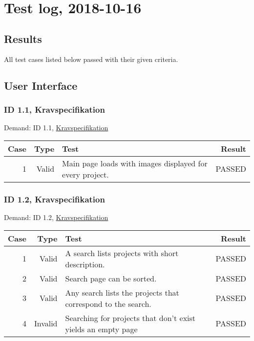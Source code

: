 \documentclass{TDP003mall}
\begin{document}
\section{Test log, 2018-10-16}
\subsection{Results}
All test cases listed below passed with their given criteria.
\subsection{User Interface}
\subsubsection{ID 1.1, Kravspecifikation}
Demand: ID 1.1, \href{https://www.ida.liu.se/~TDP003/current/projekt/dokument/systemspecifikation.pdf}{Kravspecifikation}
\begin{table}[!h]
\begin{tabularx}{\linewidth}{|r|r|X|r|}\hline
\textbf{Case} & \textbf{Type} & \textbf{Test} & \textbf{Result} \\\hline
1 & Valid & Main page loads with images displayed for every project. & PASSED \\\hline
\end{tabularx}
\end{table}


\subsubsection{ID 1.2, Kravspecifikation}
Demand: ID 1.2, \href{https://www.ida.liu.se/~TDP003/current/projekt/dokument/systemspecifikation.pdf}{Kravspecifikation}
\begin{table}[!h]
\begin{tabularx}{\linewidth}{|r|r|X|r|}\hline
\textbf{Case} &\textbf{Type} & \textbf{Test} & \textbf{Result} \\\hline
1 &Valid & A search lists projects with short description. & PASSED \\\hline
2 &Valid & Search page can be sorted.  & PASSED \\\hline
3 &Valid & Any search lists the projects that correspond to the search.  & PASSED \\\hline
4 &Invalid & Searching for projects that don't exist yields an empty page & PASSED \\\hline
\end{tabularx}
\end{table}
\end{document}
